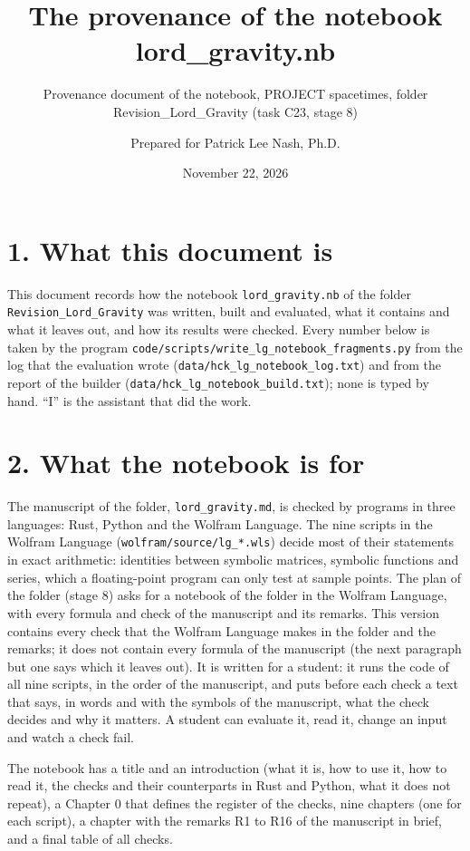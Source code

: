 \documentclass[
  10pt,
]{article}
\title{The provenance of the notebook lord\_gravity.nb}
\subtitle{Provenance document of the notebook, PROJECT spacetimes,
folder Revision\_Lord\_Gravity (task C23, stage 8)}
\author{Prepared for Patrick Lee Nash, Ph.D.}
\date{November 22, 2026}
\begin{document}
\maketitle

\hypertarget{what-this-document-is}{%
\section{1. What this document is}\label{what-this-document-is}}

This document records how the notebook \texttt{lord\_gravity.nb} of the
folder \texttt{Revision\_Lord\_Gravity} was written, built and
evaluated, what it contains and what it leaves out, and how its results
were checked. Every number below is taken by the program
\texttt{code/scripts/write\_lg\_notebook\_fragments.py} from the log
that the evaluation wrote (\texttt{data/hck\_lg\_notebook\_log.txt}) and
from the report of the builder
(\texttt{data/hck\_lg\_notebook\_build.txt}); none is typed by hand.
``I'' is the assistant that did the work.

\hypertarget{what-the-notebook-is-for}{%
\section{2. What the notebook is for}\label{what-the-notebook-is-for}}

The manuscript of the folder, \texttt{lord\_gravity.md}, is checked by
programs in three languages: Rust, Python and the Wolfram Language. The
nine scripts in the Wolfram Language (\texttt{wolfram/source/lg\_*.wls})
decide most of their statements in exact arithmetic: identities between
symbolic matrices, symbolic functions and series, which a floating-point
program can only test at sample points. The plan of the folder (stage 8)
asks for a notebook of the folder in the Wolfram Language, with every
formula and check of the manuscript and its remarks. This version
contains every check that the Wolfram Language makes in the folder and
the remarks; it does not contain every formula of the manuscript (the
next paragraph but one says which it leaves out). It is written for a
student: it runs the code of all nine scripts, in the order of the
manuscript, and puts before each check a text that says, in words and
with the symbols of the manuscript, what the check decides and why it
matters. A student can evaluate it, read it, change an input and watch a
check fail.

The notebook has a title and an introduction (what it is, how to use it,
how to read it, the checks and their counterparts in Rust and Python,
what it does not repeat), a Chapter 0 that defines the register of the
checks, nine chapters (one for each script), a chapter with the remarks
R1 to R16 of the manuscript in brief, and a final table of all checks.
\end{document}
